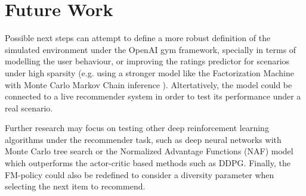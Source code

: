 \section{Future Work}

Possible next steps can attempt to define a more robust definition of the simulated environment under the OpenAI gym framework, specially in terms of modelling the user behaviour, or improving the ratings predictor for scenarios under high sparsity (e.g. using a stronger model like the Factorization Machine with Monte Carlo Markov Chain inference \cite{rendle2012factorization}). Altertatively, the model could be connected to a live recommender system in order to test its performance under a real scenario.

Further research may focus on testing other deep reinforcement learning algorithms under the recommender task, such as deep neural networks with Monte Carlo tree search \cite{silver2016mastering} or the Normalized Advantage Functions (NAF) model \cite{gu2016continuous} which outperforms the actor-critic based methods such as DDPG. Finally, the FM-policy could also be redefined to consider a diversity parameter when selecting the next item to recommend.